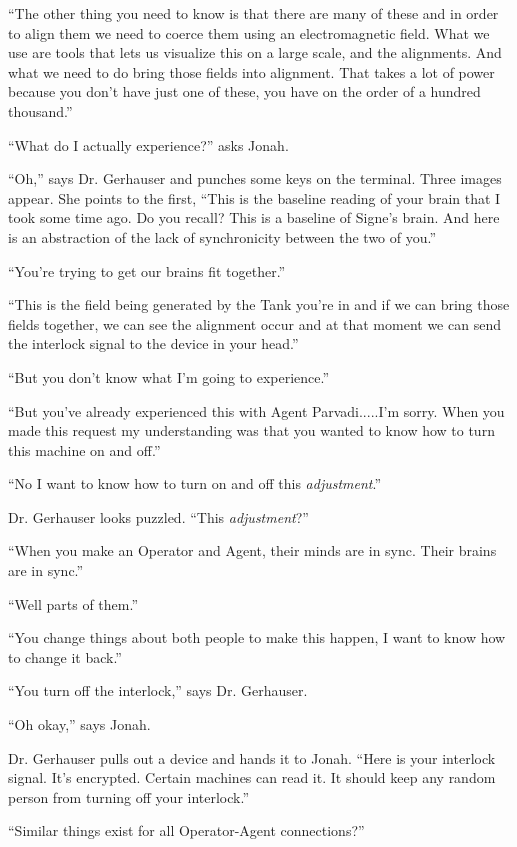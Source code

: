 ``The other thing you need to know is that there are many of these and in order to align them we need to coerce them using an electromagnetic field.  What we use are tools that lets us visualize this on a large scale, and the alignments.  And what we need to do bring those fields into alignment.  That takes a lot of power because you don't have just one of these, you have on the order of a hundred thousand.''

``What do I actually experience?'' asks Jonah.

``Oh,'' says Dr. Gerhauser and punches some keys on the terminal.  Three images appear.  She points to the first, ``This is the baseline reading of your brain that I took some time ago.  Do you recall?  This is a baseline of Signe's brain.  And here is an abstraction of the lack of synchronicity between the two of you.''

``You're trying to get our brains fit together.''

``This is the field being generated by the Tank you're in and if we can bring those fields together, we can see the alignment occur and at that moment we can send the interlock signal to the device in your head.''

``But you don't know what I'm going to experience.''

``But you've already experienced this with Agent Parvadi.....I'm sorry.  When you made this request my understanding was that you wanted to know how to turn this machine on and off.''

``No I want to know how to turn on and off this \textit{adjustment}.''

Dr. Gerhauser looks puzzled.  ``This \textit{adjustment}?''

``When you make an Operator and Agent, their minds are in sync.  Their brains are in sync.''

``Well parts of them.''

``You change things about both people to make this happen, I want to know how to change it back.''

``You turn off the interlock,'' says Dr. Gerhauser.  

``Oh okay,'' says Jonah.

Dr. Gerhauser pulls out a device and hands it to Jonah. ``Here is your interlock signal.  It's encrypted. Certain machines can read it.  It should keep any random person from turning off your interlock.''

``Similar things exist for all Operator-Agent connections?''

